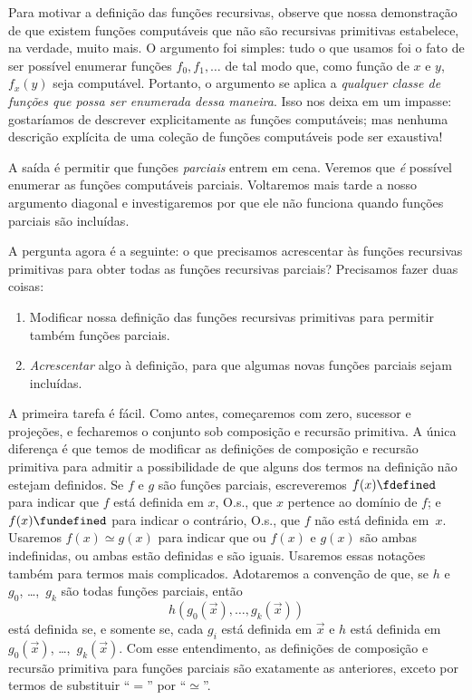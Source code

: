 \documentclass[../../../include/open-logic-section]{subfiles}
\begin{document}


Para motivar a definição das funções recursivas, observe que nossa
demonstração de que existem funções computáveis que não são recursivas
primitivas estabelece, na verdade, muito mais. O argumento foi simples:
tudo o que usamos foi o fato de ser possível enumerar funções
$f_0,f_1,\dots$ de tal modo que, como função de $x$ e $y$, $f_x(y)$
seja computável. Portanto, o argumento se aplica a \emph{qualquer classe
  de funções que possa ser enumerada dessa maneira}. Isso nos deixa em
um impasse: gostaríamos de descrever explicitamente as funções
computáveis; mas nenhuma descrição explícita de uma coleção de funções
computáveis pode ser exaustiva!

A saída é permitir que funções \emph{parciais} entrem em cena. Veremos
que \emph{é} possível enumerar as funções computáveis
parciais. Voltaremos mais tarde a nosso argumento diagonal e
investigaremos por que ele não funciona quando funções parciais são
incluídas.

A pergunta agora é a seguinte: o que precisamos acrescentar às funções
recursivas primitivas para obter todas as funções recursivas parciais?
Precisamos fazer duas coisas:
\begin{enumerate}
\item Modificar nossa definição das funções recursivas primitivas para
  permitir também funções parciais.
\item \emph{Acrescentar} algo à definição, para que algumas novas funções
  parciais sejam incluídas.
\end{enumerate}

A primeira tarefa é fácil. Como antes, começaremos com zero, sucessor e
projeções, e fecharemos o conjunto sob composição e recursão primitiva.
A única diferença é que temos de modificar as definições de composição
e recursão primitiva para admitir a possibilidade de que alguns dos
termos na definição não estejam definidos. Se $f$ e $g$ são funções
parciais, escreveremos $f(x) \fdefined$ para indicar que $f$ está
definida em $x$, O.s.\@, que $x$ pertence ao domínio de $f$; e
$f(x) \fundefined$ para indicar o contrário, O.s.\@, que $f$ não está
definida em~$x$. Usaremos $f(x) \simeq g(x)$ para indicar que ou
$f(x)$ e $g(x)$ são ambas indefinidas, ou ambas estão definidas e são
iguais. Usaremos essas notações também para termos mais complicados.
Adotaremos a convenção de que, se $h$ e $g_0$, \dots,~$g_k$ são todas
funções parciais, então
\[
h(g_0(\vec x),\dots,g_k(\vec x))
\]
está definida se, e somente se, cada $g_i$ está definida em $\vec x$ e
$h$ está definida em $g_0(\vec x)$, \dots,~$g_k(\vec x)$. Com esse
entendimento, as definições de composição e recursão primitiva para
funções parciais são exatamente as anteriores, exceto por termos de
substituir ``$=$'' por ``$\simeq$''.
\end{document}

